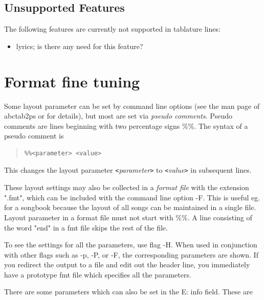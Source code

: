 \documentclass[a4paper]{article}
\begin{document}
\subsection{Unsupported Features}
The following features are currently not supported in tablature lines:
\begin{itemize}
\item lyrics; is there any need for this feature?
\end{itemize}

\section{Format fine tuning}
\label{sec:FormatFineTuning}
 
Some layout parameter can be set by command line options (see the
man page of abctab2ps or for details), but most are set via
{\it pseudo comments}. Pseudo comments are lines beginning with 
two percentage signs \%\%. The syntax of a 
pseudo comment is
\begin{quote}
\begin{verbatim}
%%<parameter> <value>
\end{verbatim}
\end{quote}
This changes the layout parameter {\it \verb$<$parameter\verb$>$ } to 
{\it \verb$<$value\verb$>$ } in subsequent lines.
\par
These layout settings may also be collected in a {\it format file}
with the extension ".fmt", which can be included with the
command line option -F. This is useful eg. for a songbook because 
the layout of all songs can be maintained in a single file.
Layout parameter in a format file must not start with \%\%.
A line consisting of the word "end" in a fmt file skips the
rest of the file.
\par
To see the settings for all the parameters, use flag -H.
When used in conjunction with other flags such as -p, -P, or -F,
the corresponding parameters are shown. If you redirect the
output to a file and edit out the header line, you immediately
have a prototype fmt file which specifies all the parameters.
\par
There are some parameters which can also be set in the E: info field.
These are
\end{document}
